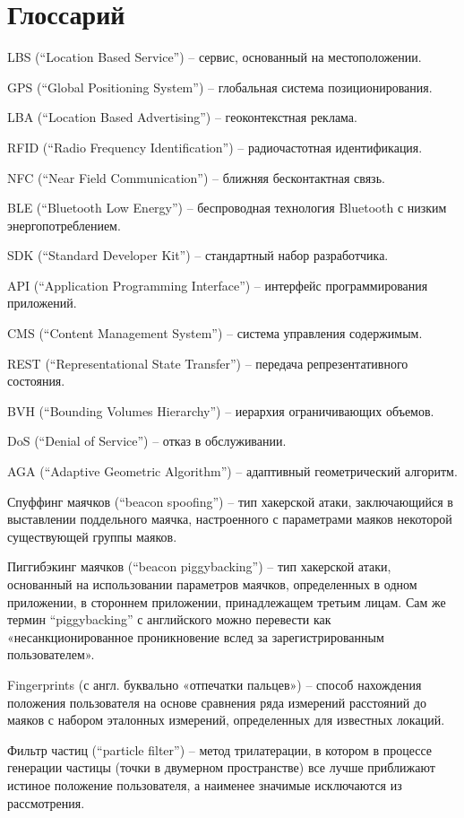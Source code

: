 \section{Глоссарий}

LBS (“Location Based Service”) – сервис, основанный на местоположении.

GPS (“Global Positioning System”) – глобальная система позиционирования.

LBA (“Location Based Advertising”) – геоконтекстная реклама.

RFID (“Radio Frequency Identification”) – радиочастотная идентификация.

NFC (“Near Field Communication”) – ближняя бесконтактная связь.

BLE (“Bluetooth Low Energy”) – беспроводная технология Bluetooth с низким энергопотреблением.

SDK (“Standard Developer Kit”) – стандартный набор разработчика.

API (“Application Programming Interface”) – интерфейс программирования приложений.

CMS (“Content Management System”) – система управления содержимым.

REST (“Representational State Transfer”) – передача репрезентативного состояния.

BVH (“Bounding Volumes Hierarchy”) – иерархия ограничивающих объемов.

DoS (“Denial of Service”) – отказ в обслуживании.

AGA (“Adaptive Geometric Algorithm”) – адаптивный геометрический алгоритм.

Спуффинг маячков (“beacon spoofing”) – тип хакерской атаки, заключающийся в выставлении поддельного маячка, настроенного с параметрами маяков некоторой существующей группы маяков.

Пиггибэкинг маячков (“beacon piggybacking”) – тип хакерской атаки, основанный на использовании параметров маячков, определенных в одном приложении, в стороннем приложении, принадлежащем третьим лицам. Сам же термин “piggybacking” с английского можно перевести как «несанкционированное проникновение вслед за зарегистрированным пользователем».

Fingerprints (с англ. буквально «отпечатки пальцев») – способ нахождения положения пользователя на основе сравнения ряда измерений расстояний до маяков с набором эталонных измерений, определенных для известных локаций.

Фильтр частиц (“particle filter”) – метод трилатерации, в котором в процессе генерации частицы (точки в двумерном пространстве) все лучше приближают истиное положение пользователя, а наименее значимые исключаются из рассмотрения.

